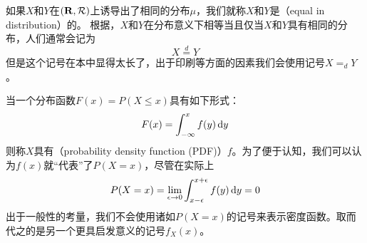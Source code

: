 \documentclass[main.tex]{subfiles}
\begin{document}
如果\(X\)和\(Y\)在\((\mathbf{R},\mathcal{R})\)上诱导出了相同的分布\(\mu\)，我们就称\(X\)和\(Y\)是（equal in distribution）的。
根据，\(X\)和\(Y\)在分布意义下相等当且仅当\(X\)和\(Y\)具有相同的分布，人们通常会记为
\[X \stackrel{d}{=} Y\]
但是这个记号在本中显得太长了，出于印刷等方面的因素我们会使用记号\(X =_d Y\)。

当一个分布函数\(F(x) = P(X \leq x)\)具有如下形式：
\begin{equation}\label{eq:1.2.1}
	F(x) = \int_{-\infty}^{x}f(y) \dif y
\end{equation}
则称\(X\)具有（probability density function (PDF)）\(f\)。为了便于认知，我们可以认为\(f(x)\)就``代表''了\(P(X=x)\)，尽管在实际上
\[P(X = x) = \lim\limits_{\epsilon \rightarrow 0}\int_{x-\epsilon}^{x+\epsilon} f(y) \dif y = 0\]
出于一般性的考量，我们不会使用诸如\(P(X=x)\)的记号来表示密度函数。取而代之的是另一个更具启发意义的记号\(f_X(x)\)。
\end{document}
